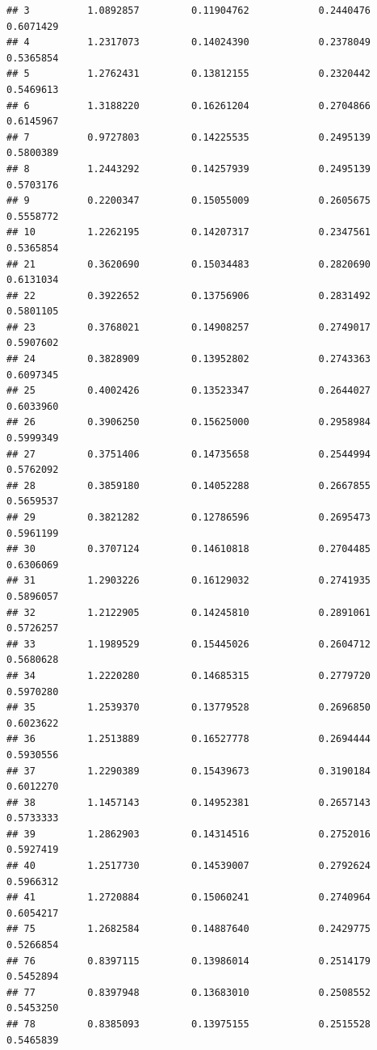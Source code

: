 \documentclass[]{article}
\begin{document}
\begin{verbatim}
## 3          1.0892857         0.11904762            0.2440476        0.6071429
## 4          1.2317073         0.14024390            0.2378049        0.5365854
## 5          1.2762431         0.13812155            0.2320442        0.5469613
## 6          1.3188220         0.16261204            0.2704866        0.6145967
## 7          0.9727803         0.14225535            0.2495139        0.5800389
## 8          1.2443292         0.14257939            0.2495139        0.5703176
## 9          0.2200347         0.15055009            0.2605675        0.5558772
## 10         1.2262195         0.14207317            0.2347561        0.5365854
## 21         0.3620690         0.15034483            0.2820690        0.6131034
## 22         0.3922652         0.13756906            0.2831492        0.5801105
## 23         0.3768021         0.14908257            0.2749017        0.5907602
## 24         0.3828909         0.13952802            0.2743363        0.6097345
## 25         0.4002426         0.13523347            0.2644027        0.6033960
## 26         0.3906250         0.15625000            0.2958984        0.5999349
## 27         0.3751406         0.14735658            0.2544994        0.5762092
## 28         0.3859180         0.14052288            0.2667855        0.5659537
## 29         0.3821282         0.12786596            0.2695473        0.5961199
## 30         0.3707124         0.14610818            0.2704485        0.6306069
## 31         1.2903226         0.16129032            0.2741935        0.5896057
## 32         1.2122905         0.14245810            0.2891061        0.5726257
## 33         1.1989529         0.15445026            0.2604712        0.5680628
## 34         1.2220280         0.14685315            0.2779720        0.5970280
## 35         1.2539370         0.13779528            0.2696850        0.6023622
## 36         1.2513889         0.16527778            0.2694444        0.5930556
## 37         1.2290389         0.15439673            0.3190184        0.6012270
## 38         1.1457143         0.14952381            0.2657143        0.5733333
## 39         1.2862903         0.14314516            0.2752016        0.5927419
## 40         1.2517730         0.14539007            0.2792624        0.5966312
## 41         1.2720884         0.15060241            0.2740964        0.6054217
## 75         1.2682584         0.14887640            0.2429775        0.5266854
## 76         0.8397115         0.13986014            0.2514179        0.5452894
## 77         0.8397948         0.13683010            0.2508552        0.5453250
## 78         0.8385093         0.13975155            0.2515528        0.5465839

\end{verbatim}
\end{document}
